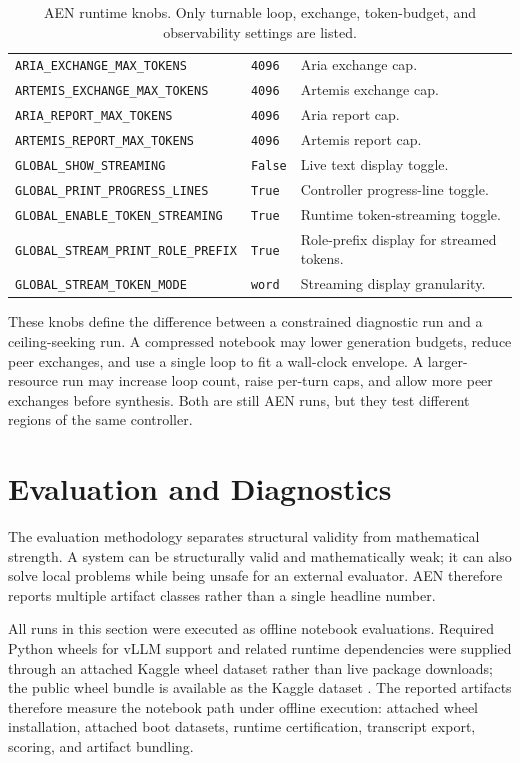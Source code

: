 \documentclass[11pt]{article}
\begin{document}
\begin{table}[H]
\begin{tabularx}{\textwidth}{>{\raggedright\arraybackslash}p{}>{\raggedright\arraybackslash}p{}X}
\texttt{ARIA\_EXCHANGE\_MAX\_TOKENS} & \texttt{4096} & Aria exchange cap. \\
\texttt{ARTEMIS\_EXCHANGE\_MAX\_TOKENS} & \texttt{4096} & Artemis exchange cap. \\
\texttt{ARIA\_REPORT\_MAX\_TOKENS} & \texttt{4096} & Aria report cap. \\
\texttt{ARTEMIS\_REPORT\_MAX\_TOKENS} & \texttt{4096} & Artemis report cap. \\
\texttt{GLOBAL\_SHOW\_STREAMING} & \texttt{False} & Live text display toggle. \\
\texttt{GLOBAL\_PRINT\_PROGRESS\_LINES} & \texttt{True} & Controller progress-line toggle. \\
\texttt{GLOBAL\_ENABLE\_TOKEN\_STREAMING} & \texttt{True} & Runtime token-streaming toggle. \\
\texttt{GLOBAL\_STREAM\_PRINT\_ROLE\_PREFIX} & \texttt{True} & Role-prefix display for streamed tokens. \\
\texttt{GLOBAL\_STREAM\_TOKEN\_MODE} & \texttt{word} & Streaming display granularity. \\
\bottomrule
\end{tabularx}
\caption{AEN runtime knobs. Only turnable loop, exchange, token-budget, and observability settings are listed.}
\label{tab:runtime-knobs}
\end{table}

These knobs define the difference between a constrained diagnostic run and a ceiling-seeking run. A compressed notebook may lower generation budgets, reduce peer exchanges, and use a single loop to fit a wall-clock envelope. A larger-resource run may increase loop count, raise per-turn caps, and allow more peer exchanges before synthesis. Both are still AEN runs, but they test different regions of the same controller.

\clearpage
\section{Evaluation and Diagnostics}

The evaluation methodology separates structural validity from mathematical strength. A system can be structurally valid and mathematically weak; it can also solve local problems while being unsafe for an external evaluator. AEN therefore reports multiple artifact classes rather than a single headline number.

All runs in this section were executed as offline notebook evaluations. Required Python wheels for vLLM support and related runtime dependencies were supplied through an attached Kaggle wheel dataset rather than live package downloads; the public wheel bundle is available as the Kaggle dataset \citet{paudel2026wheels}. The reported artifacts therefore measure the notebook path under offline execution: attached wheel installation, attached boot datasets, runtime certification, transcript export, scoring, and artifact bundling.
\end{document}
